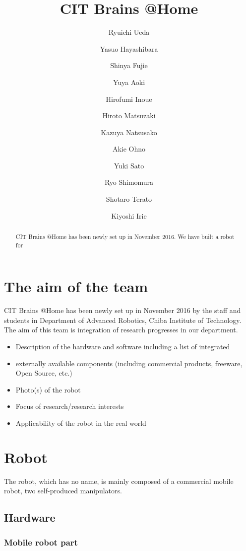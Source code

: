 \documentclass{llncs}
\begin{document}
\title{CIT Brains @Home}

\author{Ryuichi Ueda \and
Yasuo Hayashibara \and
Shinya Fujie \and
Yuya Aoki \and
Hirofumi Inoue \and
Hiroto Matsuzaki \and
Kazuya Natsusako \and
Akie Ohno \and
Yuki Sato \and
Ryo Shimomura \and
Shotaro Terato \and
Kiyoshi Irie
}


\maketitle
%
\begin{abstract}
CIT Brains @Home has been newly set up in November 2016.
We have built a robot for 
\end{abstract}
%
\section{The aim of the team}

CIT Brains @Home has been newly set up in November 2016
by the staff and students in Department of Advanced Robotics,
Chiba Institute of Technology.
The aim of this team is integration of research progresses
in our department.

\begin{itemize}
	\item    Description of the hardware and software including a list of integrated 
	\item    externally available components (including commercial products, freeware, Open Source, etc.) 
	\item    Photo(s) of the robot 
	\item    Focus of research/research interests 
	\item    Applicability of the robot in the real world
\end{itemize}

\section{Robot}
The robot, which has no name, is mainly composed of a commercial mobile robot,
two self-produced manipulators.

\subsection{Hardware}
\subsubsection{Mobile robot part}
\end{document}
